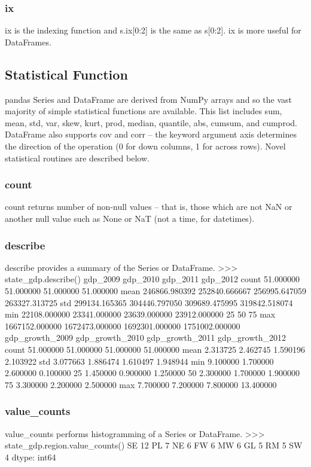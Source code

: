 \documentclass[KSmain.tex]{subfiles}
\begin{document}
\subsubsection{ix}
ix is the indexing function and s.ix[0:2] is the same as s[0:2]. ix is more useful for DataFrames.



\subsection{Statistical Function}
pandas Series and DataFrame are derived from NumPy arrays and so the vast majority of simple statistical
functions are available. This list includes sum, mean, std, var, skew, kurt, prod, median, quantile, abs,
cumsum, and cumprod. DataFrame also supports cov and corr – the keyword argument axis determines the
direction of the operation (0 for down columns, 1 for across rows). Novel statistical routines are described
below.
\subsubsection*{count}
count returns number of non-null values – that is, those which are not NaN or another null value such as
None or NaT (not a time, for datetimes).
\subsubsection*{describe}
describe provides a summary of the Series or DataFrame.
>>> state_gdp.describe()
gdp_2009 gdp_2010 gdp_2011 gdp_2012
count 51.000000 51.000000 51.000000 51.000000
mean 246866.980392 252840.666667 256995.647059 263327.313725
std 299134.165365 304446.797050 309689.475995 319842.518074
min 22108.000000 23341.000000 23639.000000 23912.000000
25%
50%
75%
max 1667152.000000 1672473.000000 1692301.000000 1751002.000000
gdp_growth_2009 gdp_growth_2010 gdp_growth_2011 gdp_growth_2012
count 51.000000 51.000000 51.000000 51.000000
mean 2.313725
2.462745 1.590196 2.103922
std 3.077663 1.886474 1.610497 1.948944
min 9.100000
1.700000
2.600000
0.100000
25%
1.450000 0.900000 1.250000
50%
2.300000 1.700000 1.900000
75%
3.300000 2.200000 2.500000
max 7.700000 7.200000 7.800000 13.400000

\subsubsection*{value\_counts}
value\_counts performs histogramming of a Series or DataFrame.
>>> state_gdp.region.value_counts()
SE 12
PL 7
NE 6
FW 6
MW 6
GL 5
RM 5
SW 4
dtype: int64
\end{document}
